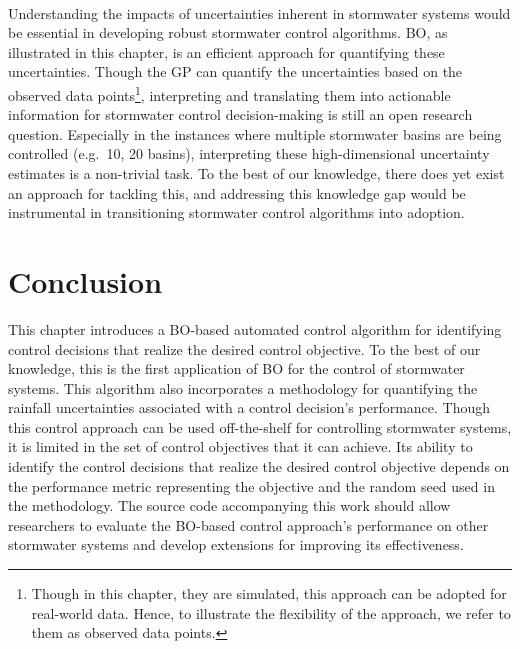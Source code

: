 \

Understanding the impacts of uncertainties inherent in stormwater systems would be essential in developing robust stormwater control algorithms.
BO, as illustrated in this chapter, is an efficient approach for quantifying these uncertainties. 
Though the GP can quantify the uncertainties based on the observed data points\footnote{Though in this chapter, they are simulated, this approach can be adopted for real-world data. Hence, to illustrate the flexibility of the approach, we refer to them as observed data points.}, interpreting and translating them into actionable information for stormwater control decision-making is still an open research question.
Especially in the instances where multiple stormwater basins are being controlled (e.g.\ 10, 20 basins), interpreting these high-dimensional uncertainty estimates is a non-trivial task.
To the best of our knowledge, there does yet exist an approach for tackling this, and addressing this knowledge gap would be instrumental in transitioning stormwater control algorithms into adoption. 

\section{Conclusion}
This chapter introduces a BO-based automated control algorithm for identifying control decisions that realize the desired control objective.
To the best of our knowledge, this is the first application of BO for the control of stormwater systems.
This algorithm also incorporates a methodology for quantifying the rainfall uncertainties associated with a control decision's performance.
Though this control approach can be used off-the-shelf for controlling stormwater systems, it is limited in the set of control objectives that it can achieve.
Its ability to identify the control decisions that realize the desired control objective depends on the performance metric representing the objective and the random seed used in the methodology.
The source code accompanying this work should allow researchers to evaluate the BO-based control approach's performance on other stormwater systems and develop extensions for improving its effectiveness.
